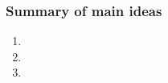 \documentclass[slidestop,compress,mathserif,12pt,t,professionalfonts,xcolor=table]{beamer}
\begin{document}

\begin{frame}
\frametitle{Summary of main ideas}

\vfill

\begin{enumerate}

\item {}

\item {}

\item {}

\end{enumerate}

\vfill

\end{frame}

\end{document}
